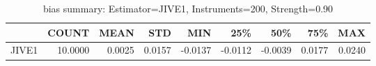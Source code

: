 \begin{table}[ht]
\centering
\caption{bias summary: Estimator=JIVE1, Instruments=200, Strength=0.90}
\begin{tabular}{lrrrrrrrr}
\toprule
 & COUNT & MEAN & STD & MIN & 25\% & 50\% & 75\% & MAX \\
\midrule
JIVE1 & 10.0000 & 0.0025 & 0.0157 & -0.0137 & -0.0112 & -0.0039 & 0.0177 & 0.0240 \\
\bottomrule
\end{tabular}
\end{table}
